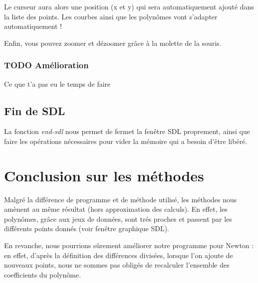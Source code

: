 \documentclass[letter]{article}
\begin{document}
Le curseur aura alors une position (x et y) qui sera automatiquement ajouté dans la liste des points. Les courbes ainsi que les polynômes vont s'adapter automatiquement !


Enfin, vous pouvez zoomer et dézoomer grâce à la molette de la souris.

\subsubsection{{\bfseries\sffamily TODO} Amélioration}
\label{sec:org2adced7}

Ce que t'a pas eu le temps de faire

\subsection{Fin de SDL}
\label{sec:org1ef5197}

La fonction \emph{end-sdl} nous permet de fermet la fenêtre SDL proprement, ainsi que faire les opérations nécessaires pour vider la mémoire qui a besoin d'être libéré.

\section{Conclusion sur les méthodes}
\label{sec:org8caf77c}

Malgré la différence de programme et de méthode utilisé, les méthodes nous amènent au même résultat (hors approximation des calculs). En effet, les polynômes, grâce aux jeux de données, sont trés proches et passent par les différents points donnés (voir fenêtre graphique SDL).

En revanche, nous pourrions sûrement améliorer notre programme pour Newton : en effet, d'après la définition des différences divisées, lorsque l'on ajoute de nouveaux points, nous ne sommes pas obligés de recalculer l'ensemble des coefficients du polynôme.
\end{document}
